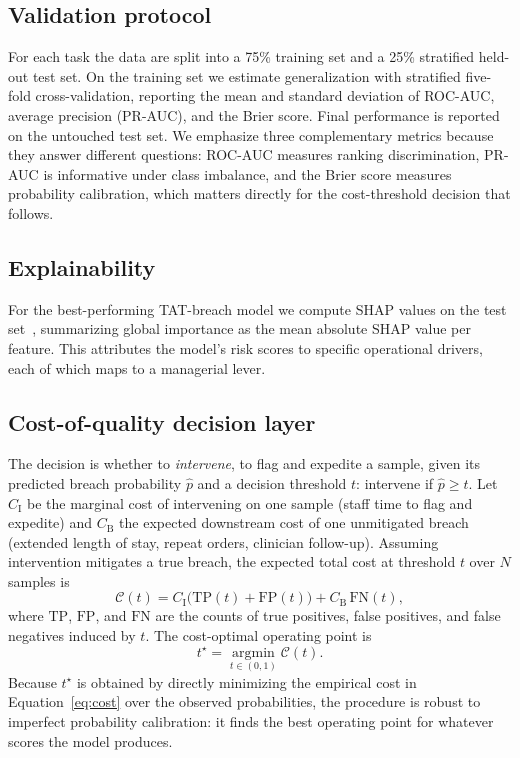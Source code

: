\documentclass[journal]{IEEEtran}
\begin{document}
\subsection{Validation protocol}
For each task the data are split into a 75\% training set and a 25\% stratified
held-out test set. On the training set we estimate generalization with stratified
five-fold cross-validation, reporting the mean and standard deviation of ROC-AUC,
average precision (PR-AUC), and the Brier score. Final performance is reported on
the untouched test set. We emphasize three complementary metrics because they
answer different questions: ROC-AUC measures ranking discrimination, PR-AUC is
informative under class imbalance, and the Brier score measures probability
calibration, which matters directly for the cost-threshold decision that follows.

\subsection{Explainability}
For the best-performing TAT-breach model we compute SHAP values on the test
set~\cite{shap2017}, summarizing global importance as the mean absolute SHAP value
per feature. This attributes the model's risk scores to specific operational
drivers, each of which maps to a managerial lever.

\subsection{Cost-of-quality decision layer}
The decision is whether to \emph{intervene}, to flag and expedite a
sample, given its predicted breach probability $\hat{p}$ and a decision threshold
$t$: intervene if $\hat{p}\geq t$. Let $C_{\mathrm{I}}$ be the marginal cost of
intervening on one sample (staff time to flag and expedite) and $C_{\mathrm{B}}$
the expected downstream cost of one unmitigated breach (extended length of stay,
repeat orders, clinician follow-up). Assuming intervention mitigates a true
breach, the expected total cost at threshold $t$ over $N$ samples is
\begin{equation}
\mathcal{C}(t) = C_{\mathrm{I}}\bigl(\mathrm{TP}(t)+\mathrm{FP}(t)\bigr)
+ C_{\mathrm{B}}\,\mathrm{FN}(t),
\label{eq:cost}
\end{equation}
where $\mathrm{TP}$, $\mathrm{FP}$, and $\mathrm{FN}$ are the counts of true
positives, false positives, and false negatives induced by $t$. The cost-optimal
operating point is
\begin{equation}
t^{\star} = \operatorname*{argmin}_{t\in(0,1)} \mathcal{C}(t).
\label{eq:argmin}
\end{equation}
Because $t^{\star}$ is obtained by directly minimizing the empirical cost in
Equation~\eqref{eq:cost} over the observed probabilities, the procedure is robust
to imperfect probability calibration: it finds the best operating point for
whatever scores the model produces.
\end{document}

